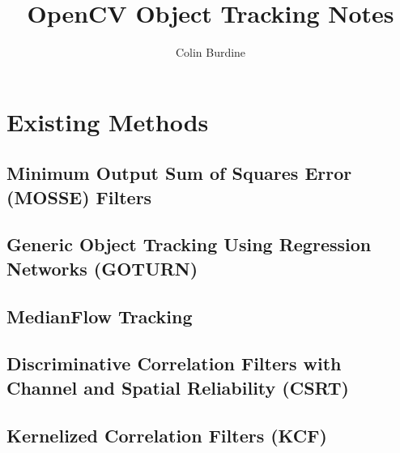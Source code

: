 \documentclass[12pt]{article}
\author{Colin Burdine}
\title{OpenCV Object Tracking Notes}
\date{}
\begin{document}
\maketitle

\section{Existing Methods}

\subsection{Minimum Output Sum of Squares Error (MOSSE) Filters}

\subsection{Generic Object Tracking Using Regression Networks (GOTURN)}

\subsection{MedianFlow Tracking}

\subsection{Discriminative Correlation Filters with Channel and Spatial Reliability (CSRT)}

\subsection{Kernelized Correlation Filters (KCF)}
\end{document}
